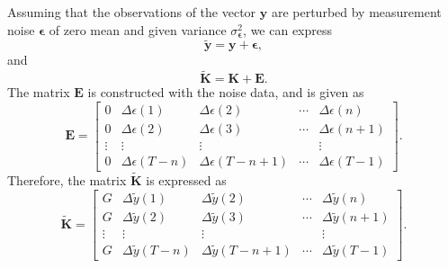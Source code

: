 
Assuming that the observations of the vector $\mathbf{y}$ are perturbed by measurement noise $\bm{\epsilon}$ of zero mean and given variance $\sigma_{\bm{\epsilon}}^2$, we can express 
\begin{equation} \widetilde{\mathbf{y}} = \mathbf{y} + \bm{\epsilon} , \label{eqn:y0plusnoise} \end{equation} 
and
\begin{equation} \widetilde{\mathbf{K}} = \mathbf{K} + \mathbf{E} . \label{eqn:K0plusnoise} \end{equation}The matrix $\mathbf{E}$ is constructed with the noise data, and is given as
\begin{equation} \mathbf{E} = \begin{bmatrix} 0 & \Delta \epsilon(1) & \Delta \epsilon(2) & \cdots & \Delta \epsilon(n) \\ 0 & \Delta \epsilon(2) & \Delta \epsilon(3) & \cdots & \Delta \epsilon(n+1) \\ \vdots & \vdots & \vdots & & \vdots \\ 0 & \Delta \epsilon(T-n) & \Delta \epsilon(T-n+1) & \cdots & \Delta \epsilon(T-1) \end{bmatrix} . \label{eqn:matrixE} \end{equation}
Therefore, the matrix $\widetilde{\mathbf{K}}$ is expressed as
\begin{equation} \widetilde{\mathbf{K}} = \begin{bmatrix} G & \Delta \widetilde{y}(1) & \Delta \widetilde{y}(2) & \cdots & \Delta \widetilde{y}(n) \\ G & \Delta \widetilde{y}(2) & \Delta \widetilde{y}(3) & \cdots & \Delta \widetilde{y}(n+1) \\ \vdots & \vdots & \vdots & & \vdots \\ G & \Delta \widetilde{y}(T-n) & \Delta \widetilde{y}(T-n+1) & \cdots & \Delta \widetilde{y}(T-1) \end{bmatrix} . \label{eqn:matrixK} \end{equation}

